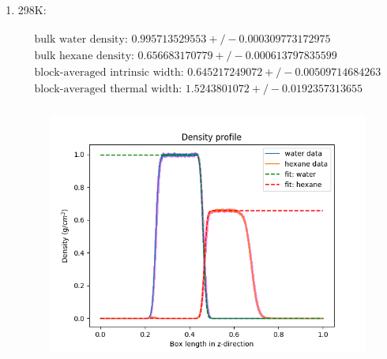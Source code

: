 \documentclass[12pt,reqno]{amsart}
\numberwithin{equation}{section}
\begin{document}
\begin{enumerate}
\item 298K:

\begin{align}
\begin{split}
\text{bulk water density: } 0.995713529553  +/- 0.000309773172975\\
\text{bulk hexane density: } 0.656683170779  +/- 0.000613797835599\\
\text{block-averaged intrinsic width: } 0.645217249072  +/- 0.00509714684263\\
\text{block-averaged thermal width: } 1.5243801072  +/- 0.0192357313655 \\
\end{split}
\end{align} 

\begin{figure}[H]
\centering
\includegraphics[scale=0.6]{interface_density_profile_full-298-1bead}
\end{figure}

\end{enumerate}
\end{document}
